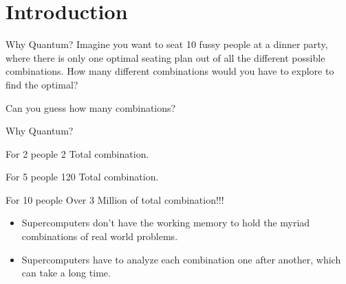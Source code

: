 \section[Introduction]{Introduction}

\begin{frame}{Why Quantum?}
Imagine you want to seat 10 fussy people at a dinner party, where there is only one optimal seating plan out of all the different possible combinations. How many different combinations would you have to explore to find the optimal?

Can you guess how many \alert{combinations}?
\end{frame}

\begin{frame}{Why Quantum?}


			
			
		
			
			
			\begin{exampleblock}{For 2 people}
				2 Total combination.
			\end{exampleblock}
			
			\begin{block}{For 5 people}
				120 Total combination.
			\end{block}
			
			\begin{alertblock}{For 10 people}
				Over 3 Million of total combination!!!
			\end{alertblock}
			
		
				
				
			
			
			
\begin{itemize}
			\item Supercomputers don't have the working \alert{memory} to hold the myriad combinations of real world problems.
			\item Supercomputers have to analyze each combination one after another, which can take a long \alert{time}.
		\end{itemize}
		
				
				

\end{frame}

